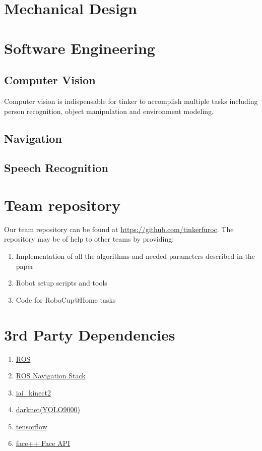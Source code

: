 \documentclass[runningheads,a4paper]{llncs}
\begin{document}
\section{Mechanical Design}


\section{Software Engineering}
\subsection{Computer Vision}
Computer vision is indispensable for tinker to accomplish multiple tasks including person recognition, object manipulation and environment modeling.


\subsection{Navigation}


\subsection{Speech Recognition}



\section{Team repository}
Our team repository can be found at \url{https://github.com/tinkerfuroc}. The repository may be of help to other teams by providing:
\begin{enumerate}
    \item Implementation of all the algorithms and needed parameters described in the paper
    \item Robot setup scripts and tools
    \item Code for RoboCup@Home tasks 
\end{enumerate}

\section{3rd Party Dependencies}
\begin{enumerate}
    \item \href{www.ros.org}{ROS}
    \item \href{github.com/ros-planning/navigation}{ROS Navigation Stack}
    \item \href{github.com/code-iai/iai\_kinect2}{iai\_kinect2}
    \item \href{github.com/pjreddie/darknet}{darknet(YOLO9000)}
    \item \href{www.tensorflow.org}{tensorflow}
    \item \href{www.faceplusplus.com}{face++ Face API}
\end{enumerate}
\end{document}
